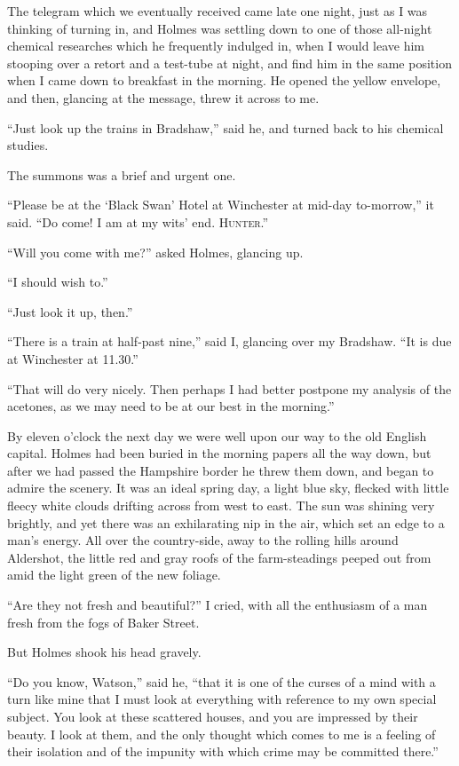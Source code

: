 The telegram which we eventually received came late one
night, just as I was thinking of turning in, and Holmes was
settling down to one of those all-night chemical researches which
he frequently indulged in, when I would leave him stooping
over a retort and a test-tube at night, and find him in the same
position when I came down to breakfast in the morning. He
opened the yellow envelope, and then, glancing at the message,
threw it across to me.

“Just look up the trains in Bradshaw,” said he, and turned
back to his chemical studies.

The summons was a brief and urgent one.

“Please be at the ‘Black Swan’ Hotel at Winchester at
mid-day to-morrow,” it said. “Do come! I am at my wits’
end. \hfill\textsc{Hunter}.”

“Will you come with me?” asked Holmes, glancing up.

“I should wish to.”

“Just look it up, then.”

“There is a train at half-past nine,” said I, glancing over
my Bradshaw. “It is due at Winchester at 11.30.”

“That will do very nicely. Then perhaps I had better
postpone my analysis of the acetones, as we may need to be
at our best in the morning.”

By eleven o’clock the next day we were well upon our way
to the old English capital. Holmes had been buried in the
morning papers all the way down, but after we had passed the
Hampshire border he threw them down, and began to admire
the scenery. It was an ideal spring day, a light blue sky,
flecked with little fleecy white clouds drifting across from
west to east. The sun was shining very brightly, and yet
there was an exhilarating nip in the air, which set an edge to
a man’s energy. All over the country-side, away to the rolling
hills around Aldershot, the little red and gray roofs of the
farm-steadings peeped out from amid the light green of the
new foliage.

“Are they not fresh and beautiful?” I cried, with all the
enthusiasm of a man fresh from the fogs of Baker Street.

But Holmes shook his head gravely.

“Do you know, Watson,” said he, “that it is one of the
curses of a mind with a turn like mine that I must look at
everything with reference to my own special subject. You
look at these scattered houses, and you are impressed by their
beauty. I look at them, and the only thought which comes
to me is a feeling of their isolation and of the impunity with
which crime may be committed there.”

